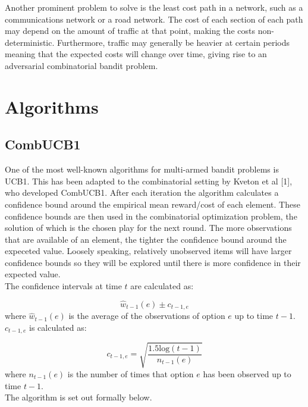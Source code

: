 Another prominent problem to solve is the least cost path in a network, such as a communications network or a road network. The cost of each section of each path may depend on the amount of traffic at that point, making the costs non-deterministic. Furthermore, traffic may generally be heavier at certain periods meaning that the expected costs will change over time, giving rise to an adversarial combinatorial bandit problem.


\pagebreak


\section{Algorithms}

\subsection{CombUCB1}

One of the most well-known algorithms for multi-armed bandit problems is UCB1. This has been adapted to the combinatorial setting by Kveton et al [1], who developed CombUCB1. After each iteration the algorithm calculates a confidence bound around the empirical mean reward/cost of each element. These confidence bounds are then used in the combinatorial optimization problem, the solution of which is the chosen play for the next round. The more observations that are available of an element, the tighter the confidence bound around the expeceted value. Loosely speaking, relatively unobserved items will have larger confidence bounds so they will be explored until there is more confidence in their expected value.\\

The confidence intervals at time $t$ are calculated as:

$$\hat{w}_{t-1}(e)\pm c_{t-1,e}$$ where $\hat{w}_{t-1}(e)$ is the average of the observations of option $e$ up to time $t-1$. $c_{t-1,e}$ is calculated as:

$$c_{t-1,e}=\sqrt{\frac{1.5\textrm{log}(t-1)}{n_{t-1}(e)}}$$ where $n_{t-1}(e)$ is the number of times that option $e$ has been observed up to time $t-1$.\\

The algorithm is set out formally below.

